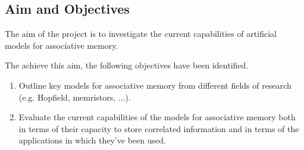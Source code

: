 \subsection{Aim and Objectives}


The aim of the project is to investigate the current capabilities of artificial models for associative memory.

The achieve this aim, the following objectives have been identified.

\begin{enumerate}
	\item Outline key models for associative memory from different fields of research (e.g. Hopfield, memristors, ...).
	\item Evaluate the current capabilities of the models for associative memory both in terms of their capacity to store correlated information and in terms of the applications in which they've been used.
\end{enumerate}
